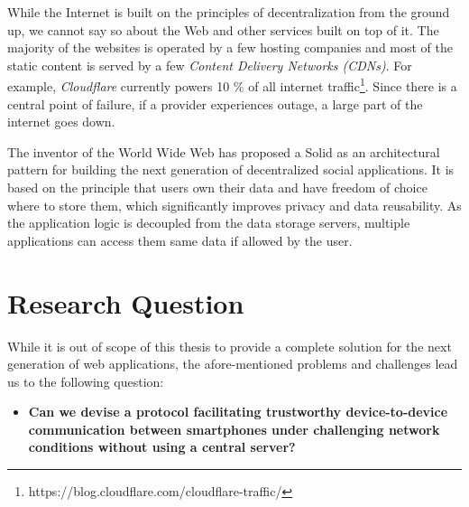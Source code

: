 While the Internet is built on the principles of decentralization from the ground up, we cannot say so about the Web and other services built on top of it. The majority of the websites is operated by a few hosting companies and most of the static content is served by a few \textit{Content Delivery Networks (CDNs)}. For example, \textit{Cloudflare} currently powers 10 \% of all internet traffic\footnote{https://blog.cloudflare.com/cloudflare-traffic/}. Since there is a central point of failure, if a provider experiences outage, a large part of the internet goes down.

The inventor of the World Wide Web has proposed a Solid \cite{solid} as an architectural pattern for building the next generation of decentralized social applications. It is based on the principle that users own their data and have freedom of choice where to store them, which significantly improves privacy and data reusability. As the application logic is decoupled from the data storage servers, multiple applications can access them same data if allowed by the user.

\section{Research Question}

While it is out of scope of this thesis to provide a complete solution for the next generation of web applications, the afore-mentioned problems and challenges lead us to the following question:

\begin{itemize}
    \item \textbf{Can we devise a protocol facilitating trustworthy device-to-device communication between smartphones under challenging network conditions without using a central server?}
\end{itemize}

